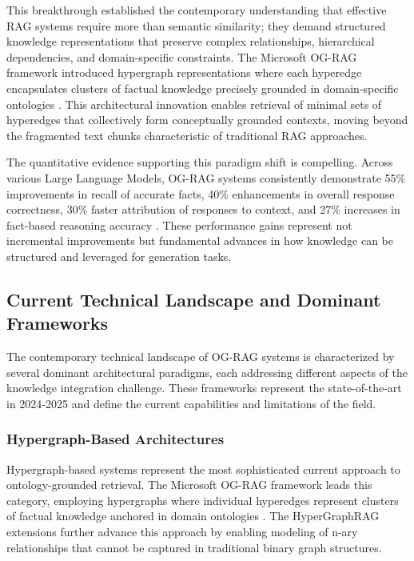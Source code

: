 This breakthrough established the contemporary understanding that effective RAG systems require more than semantic similarity; they demand structured knowledge representations that preserve complex relationships, hierarchical dependencies, and domain-specific constraints. The Microsoft OG-RAG framework introduced hypergraph representations where each hyperedge encapsulates clusters of factual knowledge precisely grounded in domain-specific ontologies \cite{chen2024og}. This architectural innovation enables retrieval of minimal sets of hyperedges that collectively form conceptually grounded contexts, moving beyond the fragmented text chunks characteristic of traditional RAG approaches.

The quantitative evidence supporting this paradigm shift is compelling. Across various Large Language Models, OG-RAG systems consistently demonstrate 55\% improvements in recall of accurate facts, 40\% enhancements in overall response correctness, 30\% faster attribution of responses to context, and 27\% increases in fact-based reasoning accuracy \cite{chen2024og}. These performance gains represent not incremental improvements but fundamental advances in how knowledge can be structured and leveraged for generation tasks.

\subsection{Current Technical Landscape and Dominant Frameworks}

The contemporary technical landscape of OG-RAG systems is characterized by several dominant architectural paradigms, each addressing different aspects of the knowledge integration challenge. These frameworks represent the state-of-the-art in 2024-2025 and define the current capabilities and limitations of the field.

\subsubsection{Hypergraph-Based Architectures}

Hypergraph-based systems represent the most sophisticated current approach to ontology-grounded retrieval. The Microsoft OG-RAG framework leads this category, employing hypergraphs where individual hyperedges represent clusters of factual knowledge anchored in domain ontologies \cite{chen2024og}. The HyperGraphRAG extensions \cite{wang2024hypergraphrag} further advance this approach by enabling modeling of n-ary relationships that cannot be captured in traditional binary graph structures.

